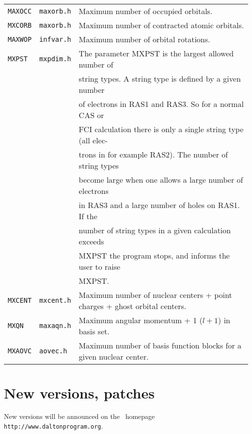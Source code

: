 \bigskip

\begin{tabular}{lll}
\verb|MAXOCC| & \verb|maxorb.h| & Maximum number of occupied
orbitals.\index{occupied orbitals!max limit}\index{limits}\\
\verb|MXCORB| & \verb|maxorb.h| & Maximum number of contracted atomic
orbitals.\index{orbitals!max limit}\index{limits!orbitals}\\
\verb|MAXWOP| & \verb|infvar.h| & Maximum number of orbital
rotations.\index{orbital rotations!max limit}\index{limits}\\
\verb|MXPST| & \verb|mxpdim.h| & The parameter MXPST is the largest
allowed number\index{limits!CI string types} of \\
&& string types.  A string type is defined by a given number \\
&& of electrons in RAS1 and RAS3. So for a normal CAS or \\
&& FCI calculation there is only a single string type (all elec-\\
&&trons in for example RAS2). The number of string types \\
&& become large when one allows a large number of electrons \\
&& in  RAS3  and a large number of holes on RAS1. If the \\
&& number of  string types in a given calculation exceeds \\
&& MXPST the program stops, and informs the user to raise\\
&& MXPST.\\
\verb|MXCENT| & \verb|mxcent.h| & Maximum number of nuclear centers +
point charges + ghost orbital centers.\index{nuclei!change max number}\index{limits!number of nuclei}\\
\verb|MXQN| & \verb|maxaqn.h| & Maximum angular momentum + 1 ($l+1$) in basis
set.\index{limits!max l-quantum number in basis functions}\\
\verb|MXAOVC| & \verb|aovec.h| & Maximum number of basis function blocks for
a given nuclear center.\index{limits!number of basis function blocks}
\end{tabular}

\section{New versions, patches}

New versions will be announced on the \dalton\
homepage \verb|http://www.daltonprogram.org|.

